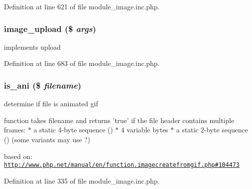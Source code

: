Definition at line 621 of file module\_\-image.inc.php.

\hypertarget{module__image_8inc_8php_a37dee9de60e2852c0631d8e60e58585c}{
\subsubsection[{image\_\-upload}]{\setlength{\rightskip}{0pt plus 5cm}image\_\-upload (\$ {\em args})}}
\label{module__image_8inc_8php_a37dee9de60e2852c0631d8e60e58585c}
implements upload 

Definition at line 683 of file module\_\-image.inc.php.

\hypertarget{module__image_8inc_8php_aba67b6eaafc9c80c5b19a9cda9604830}{
\subsubsection[{is\_\-ani}]{\setlength{\rightskip}{0pt plus 5cm}is\_\-ani (\$ {\em filename})}}
\label{module__image_8inc_8php_aba67b6eaafc9c80c5b19a9cda9604830}
determine if file is animated gif

function takes filename and returns 'true' if the file header contains multiple frames: $\ast$ a static 4-\/byte sequence () $\ast$ 4 variable bytes $\ast$ a static 2-\/byte sequence () (some variants may use  ?)

based on: \href{http://www.php.net/manual/en/function.imagecreatefromgif.php#104473}{\tt http://www.php.net/manual/en/function.imagecreatefromgif.php\#104473} 

Definition at line 335 of file module\_\-image.inc.php.


